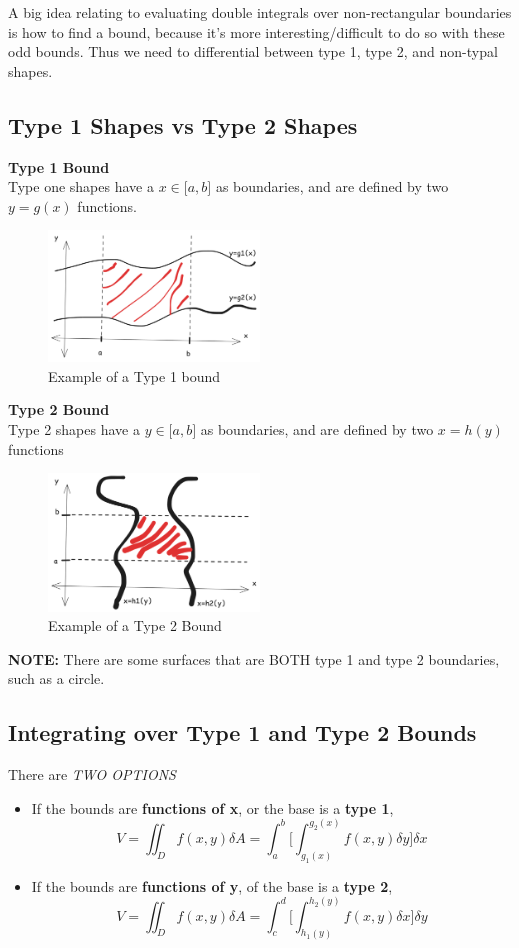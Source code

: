 \documentclass{article}
\begin{document}
A big idea relating to evaluating double integrals over non-rectangular boundaries is how to find a bound, because it's more interesting/difficult to do so with these odd bounds. Thus we need to differential between type 1, type 2, and non-typal shapes.

\subsection{Type 1 Shapes vs Type 2 Shapes}

\textbf{Type 1 Bound}\\
Type one shapes have a $x \in \lbrack a, b \rbrack$ as boundaries, and are defined by two $y = g(x)$ functions.
\begin{figure}[H]
    \centering
    \includegraphics[width=0.5\textwidth]{figures/Type1Example.png}
    \caption{Example of a Type 1 bound}
\end{figure}
\textbf{Type 2 Bound} \\
Type 2 shapes have a $y \in \lbrack a, b \rbrack$ as boundaries, and are defined by two $x = h(y)$ functions
\begin{figure}[H]
    \centering
    \includegraphics[width=0.5\textwidth]{figures/Type2Example.png}
    \caption{Example of a Type 2 Bound}
\end{figure}
\textbf{NOTE:} There are some surfaces that are BOTH type 1 and type 2 boundaries, such as a circle.

\subsection{Integrating over Type 1 and Type 2 Bounds}
There are \emph{TWO OPTIONS}
\begin{itemize}
    \item If the bounds are \textbf{functions of x}, or the base is a \textbf{type 1}, $$V = \iint_D f(x, y) \delta A = \int_{a}^{b} \big[ \int_{g_1(x)}^{g_2(x)} f(x, y) \delta y \big]\delta x$$
    \item If the bounds are \textbf{functions of y}, of the base is a \textbf{type 2}, $$V = \iint_D f(x, y) \delta A =\int_{c}^{d} \big[\int_{h_1(y)}^{h_2(y)} f(x, y) \delta x \big]  \delta y $$
\end{itemize}
\end{document}
